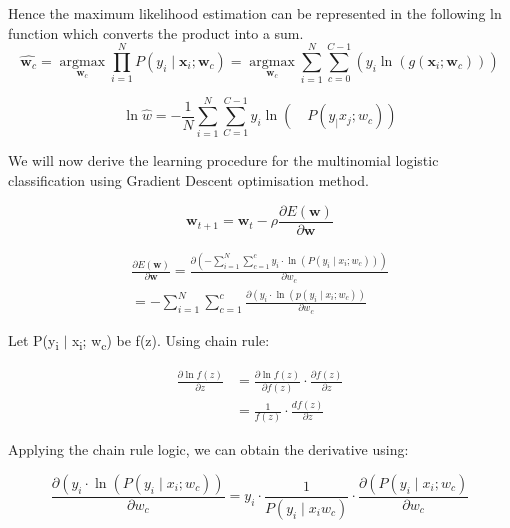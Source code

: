 \documentclass{article}
\begin{document}
Hence the maximum likelihood estimation can be represented in the following ln function which converts the product into a sum.
\begin{equation}
    \hat{\boldsymbol{w}_c}=\underset{\boldsymbol{w}_c}{\operatorname{argmax}} \prod_{i=1}^N P\left(y_i \mid \boldsymbol{x}_i ; \boldsymbol{w}_c\right)=\underset{\boldsymbol{w}_c}{\operatorname{argmax}} \sum_{i=1}^N \sum_{c=0}^{C-1}\left(y_i \ln \left(g\left(\boldsymbol{x}_i ; \boldsymbol{w}_c\right)\right)\right)
\end{equation}

\begin{equation}
    \ln \hat{w} =-\frac{1}{N} \sum_{i=1}^{N} \sum_{C=1}^{C-1} y_i\ln\left(\quad P(y_ \mid x_{j};w_{c})\right)
\end{equation}

We will now derive the learning procedure for the multinomial logistic classification using Gradient Descent optimisation method.

\begin{equation}
    \boldsymbol{w}_{t+1}=\boldsymbol{w}_t-\rho \frac{\partial E(\boldsymbol{w})}{\partial \boldsymbol{w}}
\end{equation}


$$
\begin{aligned}
    \frac{\partial E(\boldsymbol{w})}{\partial \boldsymbol{w}}=\frac{\partial\left(-\sum_{i=1}^N \sum_{c=1}^c y_i \cdot \ln \left(P\left(y_i \mid x_i ; w_c\right)\right)\right)}{\partial w_c} \\
    = -\sum_{i=1}^N \sum_{c=1}^c \frac{\partial\left(y_i \cdot \ln \left(p\left(y_i \mid x_i ; w_c\right)\right)\right.}{\partial w_c}
\end{aligned}
$$

Let P(y\textsubscript{i} $\mid$ x\textsubscript{i}; w\textsubscript{c}) be f(z). Using chain rule:

\begin{equation}
    \begin{aligned}
        \frac{\partial \ln f(z)}{\partial z} & =\frac{\partial \ln f(z)}{\partial f(z)} \cdot \frac{\partial f(z)}{\partial z} \\
        & =\frac{1}{f(z)} \cdot \frac{d f(z)}{\partial z}
    \end{aligned}
\end{equation}

Applying the chain rule logic, we can obtain the derivative using: 

\begin{equation}
    \frac{\partial\left(y_i \cdot \ln \left(P\left(y_i \mid x_i ; w_c\right)\right)\right.}{\partial w_c}=y_i \cdot \frac{1}{P\left(y_i \mid x_{i} w_c\right)} \cdot \frac{\partial\left(P\left(y_i \mid x_i ; w_c\right)\right.}{\partial w_c}
\end{equation}
\linebreak
\end{document}
